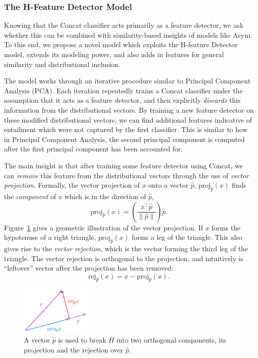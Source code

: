 \documentclass[12pt]{article}
\begin{document}
\subsubsection{The H-Feature Detector Model}

Knowing that the Concat classifier acts primarily as a feature detector, we ask
whether this can be combined with similarity-based insights of models like
Asym. To this end, we propose a novel model which exploits the H-feature
Detector model, extends its modeling power, and also adds in features for
general similarity and distributional inclusion.

The model works through an iterative procedure similar to Principal Component
Analysis (PCA). Each iteration repeatedly trains a Concat classifier under the
assumption that it acts as a feature detector, and then explicitly {\em discards}
this information from the distributional vectors. By training a new feature
detector on these modified distributional vectors, we can find additional
features indicative of entailment which were not captured by the first
classifier. This is similar to how in Principal Component Analysis, the
second principal component is computed after the first principal component
has been accounted for.

The main insight is that after training some feature detector using Concat,
we can {\em remove} this feature from the distributional vectors through
the use of {\em vector projection}.
Formally, the vector projection of $x$ onto
a vector $\hat p$, $\text{proj}_{\hat p}(x)$ finds the {\em component} of $x$
which is in the direction of $\hat p$,
\begin{equation*}
  \text{proj}_{\hat p}(x) = \left(\frac{x^\top\hat p}{\|\hat p\|}\right)\hat p.
\end{equation*}
Figure~\ref{fig:vecproj} gives a geometric illustration of the vector
projection. If $x$ forms the hypotenuse of a right
triangle, $\text{proj}_{\hat p}(x)$ forms a leg of the triangle. This also
gives rise to the {\em vector rejection}, which is the vector forming the third
leg of the triangle. The vector rejection is orthogonal to the projection, and
intuitively is ``leftover'' vector after the projection has been removed:
\begin{equation*}
  \text{rej}_{\hat p}(x) = x - \text{proj}_{\hat p}(x).
\end{equation*}

\begin{figure}
  \begin{center}
  \includegraphics[width=0.30\textwidth]{figures/vecproj}
\end{center}
\caption{A vector $\hat p$ is used to break $H$ into two orthogonal components,
its projection and the rejection over $\hat p$.}
\label{fig:vecproj}
\end{figure}
\end{document}
